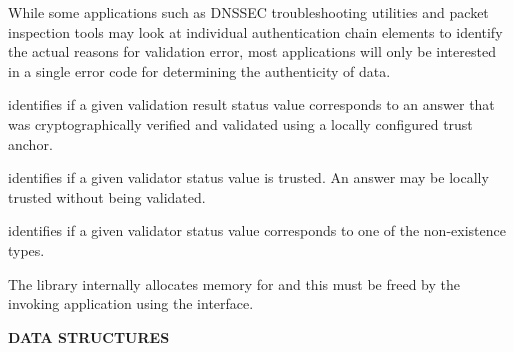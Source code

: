 While some applications such as DNSSEC troubleshooting utilities and packet
inspection tools may look at individual authentication chain elements to
identify the actual reasons for validation error, most applications will only
be interested in a single error code for determining the authenticity of data.

 identifies if a given validation result status value
corresponds to an answer that was cryptographically verified and validated
using a locally configured trust anchor.

 identifies if a given validator status value is
trusted.  An answer may be locally trusted without being validated.

 identifies if a given validator status value
corresponds to one of the non-existence types.

The  library internally allocates memory for  and
this must be freed by the invoking application using the
 interface.

{\bf DATA STRUCTURES}

